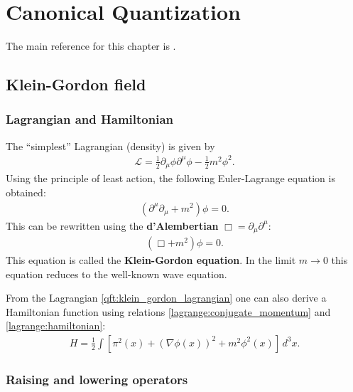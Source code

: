 \chapter{Canonical Quantization}

    The main reference for this chapter is \cite{Peskin}.

\section{Klein-Gordon field}
\subsection{Lagrangian and Hamiltonian}

    The ``simplest'' Lagrangian (density) is given by
    \begin{gather}
        \label{qft:klein_gordon_lagrangian}
        \mathcal{L} = \frac{1}{2}\partial_\mu\phi\partial^\mu\phi - \frac{1}{2}m^2\phi^2.
    \end{gather}
    Using the principle of least action, the following Euler-Lagrange equation is obtained:
    \begin{gather}
        \left(\partial^\mu\partial_\mu + m^2\right)\phi = 0.
    \end{gather}
    This can be rewritten using the \textbf{d'Alembertian} $\Box = \partial_\mu\partial^\mu$:
    \begin{gather}
        \label{qft:klein_gordon_equation}
        (\Box+m^2)\phi = 0.
    \end{gather}
    This equation is called the \textbf{Klein-Gordon equation}. In the limit $m\rightarrow0$ this equation reduces to the well-known wave equation.

    From the Lagrangian \eqref{qft:klein_gordon_lagrangian} one can also derive a Hamiltonian function using relations \ref{lagrange:conjugate_momentum} and \ref{lagrange:hamiltonian}:
    \begin{gather}
        \label{qft:klein_gordon_hamiltonian}
        H = \frac{1}{2}\int\left[\pi^2(x) + (\nabla\phi(x))^2 + m^2\phi^2(x)\right]\,d^3x.
    \end{gather}

\subsection{Raising and lowering operators}

